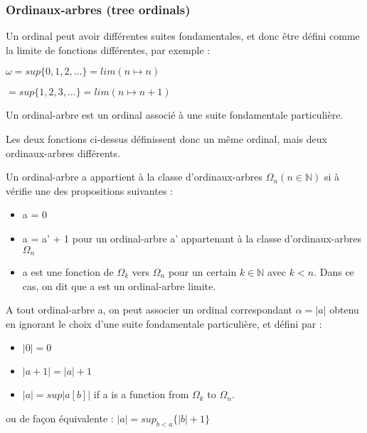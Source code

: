 \documentclass[12pt]{beamer}
\begin{document}
\begin{frame}
\frametitle{Ordinaux-arbres (tree ordinals)}

Un ordinal peut avoir différentes suites fondamentales, et donc être défini comme la limite de fonctions différentes, par exemple :

\( \omega = sup \lbrace 0, 1, 2, \ldots \rbrace = lim ( n \mapsto n ) \)

\( = sup \lbrace 1, 2, 3, \ldots \rbrace = lim ( n \mapsto n+1 ) \)

Un ordinal-arbre est un ordinal associé à une suite fondamentale particulière.

Les deux fonctions ci-dessus définissent donc un même ordinal, mais deux ordinaux-arbres différents.

\end{frame}
\begin{frame}

Un ordinal-arbre a appartient à la classe d'ordinaux-arbres \( \Omega_n (n \in \mathbb{N}) \) si à vérifie une des propositions suivantes :
\begin{itemize}
     \setlength{\itemsep}{1pt}
     \setlength{\parskip}{0pt}
     \setlength{\parsep}{0pt}
\item a = 0
\item a = a' + 1 pour un ordinal-arbre a' appartenant à la classe d'ordinaux-arbres \( \Omega_n \)
\item a est une fonction de \( \Omega_k \) vers \( \Omega_n \) pour un certain \( k \in \mathbb{N} \) avec \( k < n \). Dans ce cas, on dit que a est un ordinal-arbre limite.
\end{itemize}

\end{frame}
\begin{frame}

A tout ordinal-arbre a, on peut associer un ordinal correspondant \( \alpha = |a| \) obtenu en ignorant le choix d'une suite fondamentale particulière, et défini par :

\begin{itemize}
     \setlength{\itemsep}{1pt}
     \setlength{\parskip}{0pt}
     \setlength{\parsep}{0pt}
\item \( |0| = 0 \)
\item \( |a+1| = |a|+1 \)
\item \( |a| = sup |a[b]| \) if a is a function from \( \Omega_k \) to \( \Omega_n \).
\end{itemize}

ou de façon équivalente :
\( |a| = sup_{b<a} \lbrace |b|+1 \rbrace \)

\end{frame}
\end{document}
